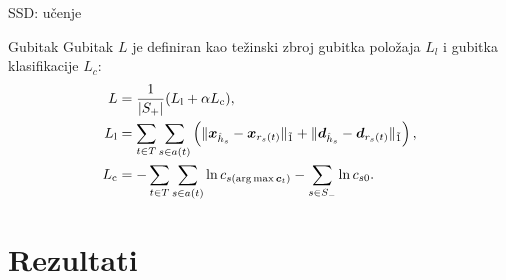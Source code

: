 \documentclass{beamer}
\begin{document}
\begin{frame}{SSD: učenje}
	\begin{block}{Gubitak}
		Gubitak $L$ je definiran kao težinski zbroj gubitka položaja $L_l$ i gubitka klasifikacije $L_c$:
		\begin{align*}
		L &= \frac{1}{\left| S_+\right|}(L_\text{l} + \alpha L_\text{c}), \\
		L_\mathrm{l} &= \sum_{t \in T} \sum_{s \in a(t)} \left(
		\lVert \bm{x}_{\hat{h}_s} - \bm{x}_{r_s(t)}
		\rVert_{\tilde{1}}
		+ \lVert \bm{d}_{\hat{h}_s} - \bm{d}_{r_s(t)}
		\rVert_{\tilde{1}} \right), \\
		L_\text{c} &= -\sum_{t \in T}\sum_{s\in a(t)}\ln c_{s(\arg\max\bm{c}_t)} 
		-\sum_{s\in S_-}\ln c_{s0}.
		\end{align*}
	\end{block}
\end{frame}


\section{Rezultati}
\end{document}
